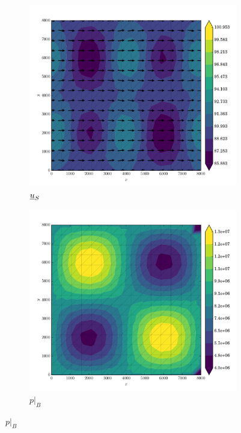 \begin{figure}
  
  \centering 

  \begin{subfigure}[b]{0.3\linewidth}
    \includegraphics[width=\linewidth]{images/stress_balance/FS/U_mag.pdf}
  \caption{$\underline{u}_S$}
  \label{fs_ms_U}
  \end{subfigure}
  \begin{subfigure}[b]{0.3\linewidth}
    \includegraphics[width=\linewidth]{images/stress_balance/FS/p.pdf}
  \caption{$p |_B$}
  \label{fs_ms_p}
  \end{subfigure}


\end{figure}
